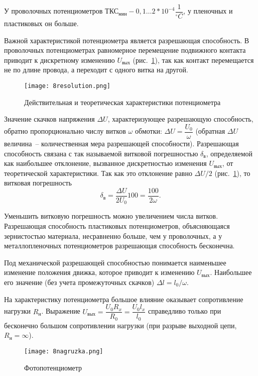 У проволочных потенциометров $ \text{ТКС}_\text{мин} - 0,1\ldots2*10^{-4} \dfrac{1}{^\circ C} $, у пленочных и пластиковых он больше.

Важной характеристикой потенциометра является разрешающая способность. В проволочных потенциометрах равномерное перемещение подвижного контакта приводит к дискретному изменению $ U_\text{вых} $ (рис.~\ref{pic:8resolution}), так как контакт перемещается не по длине провода, а переходит с одного витка на другой. 

\begin{figure}[h!]
	\caption{ Действительная и теоретическая характеристики потенциометра }
	\texttt{[image: 8resolution.png]}
	\label{pic:8resolution}
\end{figure}

Значение скачков напряжения $ \Delta U $, характеризующее разрешающую способность, обратно пропорционально числу витков $ \omega $ обмотки: $ \Delta U = \dfrac{U_0}{\omega} $ (обратная $ \Delta U $ величина~-- количественная мера разрешающей способности). Разрешающая способность связана с так называемой витковой погрешностью $ \delta_\text{в} $, определяемой как наибольшее отклонение, вызванное дискретностью изменения $ U_\text{вых} $, от теоретической характеристики. Так как это отклонение равно $ \Delta U/2 $ (рис.~\ref{pic:8resolution}), то витковая погрешность
\[ \delta_\text{в} = \dfrac{\Delta U}{2U_0} 100 = \dfrac{100}{2\omega}. \]

Уменьшить витковую погрешность можно увеличением числа витков. Разрешающая способность пластиковых потенциометров, объясняющаяся зернистостью материала, несравненно больше, чем у проволочных, а у металлопленочных потенциометров разрешающая способность бесконечна.

Под механической разрешающей способностью понимается наименьшее изменение положения движка, которое приводит к изменению $ U_\text{вых} $. Наибольшее его значение (без учета промежуточных скачков) $ \Delta l = l_0/\omega $.

На характеристику потенциометра большое влияние оказывает сопротивление нагрузки $ R_\text{н} $. Выражение $ U_\text{вых} = \dfrac{U_0 R_x}{R_0} = \dfrac{U_0 l_x}{l_0} $ справедливо только при бесконечно большом сопротивлении нагрузки (при разрыве выходной цепи, $ R_\text{н} = \infty $). 

\begin{figure}[h!]
	\caption{ Фотопотенциометр }
	\texttt{[image: 8nagruzka.png]}
	\label{pic:8nagruzka}
\end{figure}

